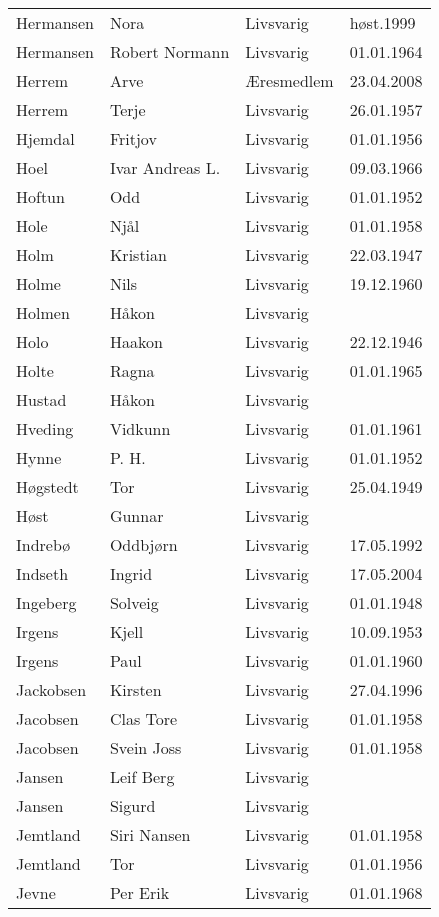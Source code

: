 \begin{longtable}{llll}
Hermansen	&	Nora	&	Livsvarig	&	høst.1999	\\
Hermansen	&	Robert Normann	&	Livsvarig 	&	01.01.1964	\\
Herrem	&	Arve	&	Æresmedlem	&	23.04.2008	\\
Herrem	&	Terje	&	Livsvarig 	&	26.01.1957	\\
Hjemdal	&	Fritjov	&	Livsvarig 	&	01.01.1956	\\
Hoel	&	Ivar Andreas L.	&	Livsvarig 	&	09.03.1966	\\
Hoftun	&	Odd	&	Livsvarig 	&	01.01.1952	\\
Hole	&	Njål	&	Livsvarig 	&	01.01.1958	\\
Holm	&	Kristian	&	Livsvarig 	&	22.03.1947	\\
Holme	&	Nils	&	Livsvarig 	&	19.12.1960	\\
Holmen	&	Håkon	&	Livsvarig 	&		\\
Holo	&	Haakon	&	Livsvarig 	&	22.12.1946	\\
Holte	&	Ragna	&	Livsvarig 	&	01.01.1965	\\
Hustad	&	Håkon	&	Livsvarig 	&		\\
Hveding	&	Vidkunn	&	Livsvarig 	&	01.01.1961	\\
Hynne	&	P. H. 	&	Livsvarig 	&	01.01.1952	\\
Høgstedt	&	Tor	&	Livsvarig 	&	25.04.1949	\\
Høst	&	Gunnar	&	Livsvarig 	&		\\
Indrebø	&	Oddbjørn	&	Livsvarig 	&	17.05.1992	\\
Indseth 	&	Ingrid	&	Livsvarig	&	17.05.2004	\\
Ingeberg	&	Solveig	&	Livsvarig 	&	01.01.1948	\\
Irgens	&	Kjell	&	Livsvarig 	&	10.09.1953	\\
Irgens	&	Paul	&	Livsvarig 	&	01.01.1960	\\
Jackobsen 	&	Kirsten	&	Livsvarig	&	27.04.1996	\\
Jacobsen	&	Clas Tore	&	Livsvarig 	&	01.01.1958	\\
Jacobsen	&	Svein Joss	&	Livsvarig 	&	01.01.1958	\\
Jansen	&	Leif Berg	&	Livsvarig 	&		\\
Jansen	&	Sigurd	&	Livsvarig 	&		\\
Jemtland	&	Siri Nansen	&	Livsvarig 	&	01.01.1958	\\
Jemtland	&	Tor	&	Livsvarig 	&	01.01.1956	\\
Jevne	&	Per Erik	&	Livsvarig 	&	01.01.1968	\\

\end{longtable}
